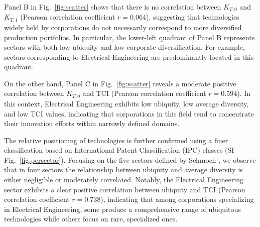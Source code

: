 \documentclass[fleqn,10pt]{wlscirep}
\begin{document}
Panel B in Fig.~\ref{fig:scatter} shows that there is no correlation between $K_{T,0}$ and $K_{T,1}$ (Pearson correlation coefficient $r=0.064$), suggesting that technologies widely held by corporations do not necessarily correspond to more diversified production portfolios. 
In particular, the lower-left quadrant of Panel B represents sectors with both low ubiquity and low corporate diversification. For example, sectors corresponding to Electrical Engineering are predominantly located in this quadrant.

On the other hand, Panel C in Fig.~\ref{fig:scatter} reveals a moderate positive correlation between $K_{T,0}$ and TCI (Pearson correlation coefficient $r=0.594$). 
In this context, Electrical Engineering exhibits low ubiquity, low average diversity, and low TCI values, indicating that corporations in this field tend to concentrate their innovation efforts within narrowly defined domains.

The relative positioning of technologies is further confirmed using a finer classification based on International Patent Classification (IPC) classes (SI Fig.~\ref{fig:persector}). 
Focusing on the five sectors defined by Schmoch \cite{Schmoch2008}, we observe that in four sectors the relationship between ubiquity and average diversity is either negligible or moderately correlated. Notably, the Electrical Engineering sector exhibits a clear positive correlation between ubiquity and TCI (Pearson correlation coefficient $r=0.738$), indicating that among corporations specializing in Electrical Engineering, some produce a comprehensive range of ubiquitous technologies while others focus on rare, specialized ones.
\end{document}
